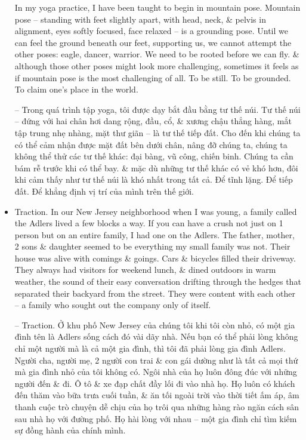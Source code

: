 \documentclass{article}
\begin{document}
\begin{itemize}
	In my yoga practice, I have been taught to begin in mountain pose. Mountain pose -- standing with feet slightly apart, with head, neck, \& pelvis in alignment, eyes softly focused, face relaxed -- is a grounding pose. Until we can feel the ground beneath our feet, supporting us, we cannot attempt the other poses: eagle, dancer, warrior. We need to be rooted before we can fly. \& although those other poses might look more challenging, sometimes it feels as if mountain pose is the most challenging of all. To be still. To be grounded. To claim one's place in the world.
	
	-- Trong quá trình tập yoga, tôi được dạy bắt đầu bằng tư thế núi. Tư thế núi -- đứng với hai chân hơi dang rộng, đầu, cổ, \& xương chậu thẳng hàng, mắt tập trung nhẹ nhàng, mặt thư giãn -- là tư thế tiếp đất. Cho đến khi chúng ta có thể cảm nhận được mặt đất bên dưới chân, nâng đỡ chúng ta, chúng ta không thể thử các tư thế khác: đại bàng, vũ công, chiến binh. Chúng ta cần bám rễ trước khi có thể bay. \& mặc dù những tư thế khác có vẻ khó hơn, đôi khi cảm thấy như tư thế núi là khó nhất trong tất cả. Để tĩnh lặng. Để tiếp đất. Để khẳng định vị trí của mình trên thế giới.
	\item {\sf Traction.} In our New Jersey neighborhood when I was young, a family called the Adlers lived a few blocks a way. If you can have a crush not just on 1 person but on an entire family, I had one on the Adlers. The father, mother, 2 sons \& daughter seemed to be everything my small family was not. Their house was alive with comings \& goings. Cars \& bicycles filled their driveway. They always had visitors for weekend lunch, \& dined outdoors in warm weather, the sound of their easy conversation drifting through the hedges that separated their backyard from the street. They were content with each other -- a family who sought out the company only of itself.
	
	-- {\sf Traction.} Ở khu phố New Jersey của chúng tôi khi tôi còn nhỏ, có một gia đình tên là Adlers sống cách đó vài dãy nhà. Nếu bạn có thể phải lòng không chỉ một người mà là cả một gia đình, thì tôi đã phải lòng gia đình Adlers. Người cha, người mẹ, 2 người con trai \& con gái dường như là tất cả mọi thứ mà gia đình nhỏ của tôi không có. Ngôi nhà của họ luôn đông đúc với những người đến \& đi. Ô tô \& xe đạp chất đầy lối đi vào nhà họ. Họ luôn có khách đến thăm vào bữa trưa cuối tuần, \& ăn tối ngoài trời vào thời tiết ấm áp, âm thanh cuộc trò chuyện dễ chịu của họ trôi qua những hàng rào ngăn cách sân sau nhà họ với đường phố. Họ hài lòng với nhau -- một gia đình chỉ tìm kiếm sự đồng hành của chính mình.
	

\end{itemize}
\end{document}
